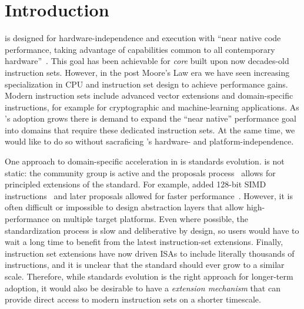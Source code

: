 \section{Introduction}


\wasm is designed for hardware-independence and execution with ``near native
code performance, taking advantage of capabilities common to all contemporary
hardware''~\cite{wasm-spec-core}. This goal has been achievable for \emph{core}
\wasm built upon now decades-old instruction sets. However, in the post Moore's
Law era we have seen increasing specialization in CPU and instruction set design
to achieve performance gains. Modern instruction sets include advanced vector
extensions and domain-specific instructions, for example for cryptographic and
machine-learning applications. As \wasm's adoption grows there is demand to
expand the ``near native'' performance goal into domains that require these
dedicated instruction sets.  At the same time, we would like to do so without
sacraficing \wasm's hardware- and platform-independence.


One approach to domain-specific acceleration in \wasm is standards evolution.
\wasm is not static: the community group is active and the proposals
process~\cite{wasm-proposals} allows for principled extensions of the standard.
For example,  added 128-bit SIMD instructions~\cite{wasm-simd} and
later proposals allowed for faster performance~\cite{wasm-relaxed-simd}.
However, it is often difficult or impossible to design abstraction layers that
allow high-performance on multiple target platforms. Even where possible, the
standardization process is slow and deliberative by design, so \wasm users would
have to wait a long time to benefit from the latest instruction-set extensions.
Finally, instruction set extensions have now driven ISAs to include literally
thousands of instructions, and it is unclear that the \wasm standard should ever
grow to a similar scale. Therefore, while standards evolution is the right
approach for longer-term adoption, it would also be desirable to have a
\emph{\wasml extension mechanism} that can provide direct access to modern
instruction sets on a shorter timescale.



